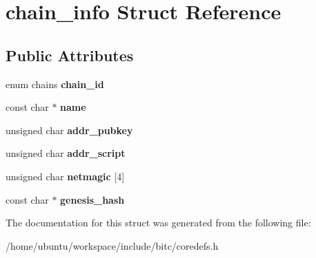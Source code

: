 \hypertarget{structchain__info}{\section{chain\-\_\-info Struct Reference}
\label{structchain__info}
}
\subsection*{Public Attributes}
\begin{DoxyCompactItemize}
\item 
\hypertarget{structchain__info_a93f517692bdd0076463bb10117217f76}{enum chains {\bfseries chain\-\_\-id}}\label{structchain__info_a93f517692bdd0076463bb10117217f76}

\item 
\hypertarget{structchain__info_aa5b3aef81bdad959cc4a477d9efc3c53}{const char $\ast$ {\bfseries name}}\label{structchain__info_aa5b3aef81bdad959cc4a477d9efc3c53}

\item 
\hypertarget{structchain__info_aa39ca2a9ed52c57da0fb9103afaa9ce8}{unsigned char {\bfseries addr\-\_\-pubkey}}\label{structchain__info_aa39ca2a9ed52c57da0fb9103afaa9ce8}

\item 
\hypertarget{structchain__info_ab3cf7d8d6f8681bc9dcf4e2345c68075}{unsigned char {\bfseries addr\-\_\-script}}\label{structchain__info_ab3cf7d8d6f8681bc9dcf4e2345c68075}

\item 
\hypertarget{structchain__info_a781b2c6c0b4cd2a978d78850964521e4}{unsigned char {\bfseries netmagic} \mbox{[}4\mbox{]}}\label{structchain__info_a781b2c6c0b4cd2a978d78850964521e4}

\item 
\hypertarget{structchain__info_ad5c4780d2f7c6741ea5c1aa34dd557b1}{const char $\ast$ {\bfseries genesis\-\_\-hash}}\label{structchain__info_ad5c4780d2f7c6741ea5c1aa34dd557b1}

\end{DoxyCompactItemize}


The documentation for this struct was generated from the following file\-:\begin{DoxyCompactItemize}
\item 
/home/ubuntu/workspace/include/bitc/coredefs.\-h\end{DoxyCompactItemize}
